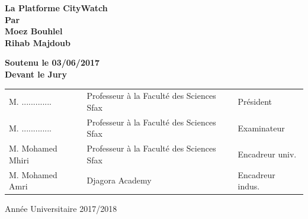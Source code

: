 \begin{titlepage}
    {\bfseries \Huge \color[RGB]{16,121,196}
        La Platforme CityWatch
    }\\[0.3in]

    {\bfseries \large Par} \\[0.25in]

    {\bfseries \LARGE \color[RGB]{255,90,90}
        Moez Bouhlel \\
        Rihab Majdoub
    }

    \vspace{0.4in}
    {\large \bfseries
        Soutenu le 03/06/2017 \\
        Devant le Jury
    }\\[0.3in]

    \normalsize
    \bfseries
    \setlength{\tabcolsep}{10pt}
    \begin{tabular}{l l l}
        M. ............. & Professeur à la Faculté des Sciences Sfax & Président \\
        M. ............. & Professeur à la Faculté des Sciences Sfax & Examinateur \\
        M. Mohamed Mhiri & Professeur à la Faculté des Sciences Sfax & Encadreur univ. \\
        M. Mohamed Amri & Djagora Academy & Encadreur indus.
    \end{tabular}

    \vfill
    Année Universitaire 2017/2018

\end{titlepage}
\restoregeometry
